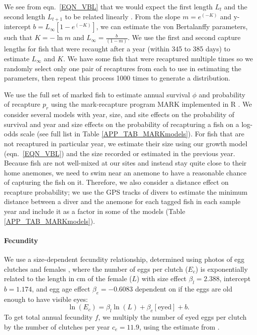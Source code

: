 \documentclass[12pt, oneside]{article}   	%
\begin{document}
We see from eqn.\ \ref{EQN_VBL} that we would expect the first length $L_t$ and the second length $L_{t+1}$ to be related linearly \citep{hart2009estimating}. From the slope $m = e^{(-K)}$ and y-intercept $b =  L_\infty[1 - e^{(-K)}]$, we can estimate the von Bertalanffy parameters, such that $K = -\ln m$ and $L_\infty = \frac{b}{(1-m)}$. We use the first and second capture lengths for fish that were recaught after a year (within 345 to 385 days) to estimate $L_\infty$ and $K$. We have some fish that were recaptured multiple times so we randomly select only one pair of recaptures from each to use in estimating the parameters, then repeat this process 1000 times to generate a distribution. 

We use the full set of marked fish to estimate annual survival $\phi$ and probability of recapture $p_r$ using the mark-recapture program MARK implemented in R \citep{RMark_Laake2013}. We consider several models with year, size, and site effects on the probability of survival and year and size effects on the probability of recapturing a fish on a log-odds scale (see full list in Table \ref{APP_TAB_MARKmodels}). For fish that are not recaptured in particular year, we estimate their size using our growth model (eqn.\ \ref{EQN_VBL}) and the size recorded or estimated in the previous year. Because fish are not well-mixed at our sites and instead stay quite close to their home anemones, we need to swim near an anemone to have a reasonable chance of capturing the fish on it. Therefore, we also consider a distance effect on recapture probability; we use the GPS tracks of divers to estimate the minimum distance between a diver and the anemone for each tagged fish in each sample year and include it as a factor in some of the models (Table \ref{APP_TAB_MARKmodels}). 

\paragraph*{Fecundity}

We use a size-dependent fecundity relationship, determined using photos of egg clutches and females \citep{yawdoszynInPrepfecundity}, where the number of eggs per clutch ($E_c$) is exponentially related to the length in cm of the female ($L$) with size effect $\beta_l = 2.388$, intercept $b = 1.174$, and egg age effect $\beta_e = -0.6083$ dependent on if the eggs are old enough to have visible eyes: 
\begin{equation} %
\ln(E_c) = \beta_l\ln(L) + \beta_e[\text{eyed}] + b. \label{EQN_Fec}
\end{equation}
To get total annual fecundity $f$, we multiply the number of eyed eggs per clutch by the number of clutches per year $c_e = 11.9$, using the estimate from \cite{holtswarth2017fecundity}.
\end{document}
